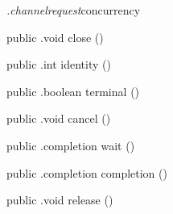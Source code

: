 \begin{CrexxClass}{\textit{.channelrequest}}{concurrency}
\begin{Members}
    \Method
      {public}
      {.void}
      {close}
      {()}

    \Method
      {public}
      {.int}
      {identity}
      {()}

    \Method
      {public}
      {.boolean}
      {terminal}
      {()}

    \Method
      {public}
      {.void}
      {cancel}
      {()}

    \Method
      {public}
      {.completion}
      {wait}
      {()}

    \Method
      {public}
      {.completion}
      {completion}
      {()}

    \Method
      {public}
      {.void}
      {release}
      {()}

  \end{Members}
\end{CrexxClass}

